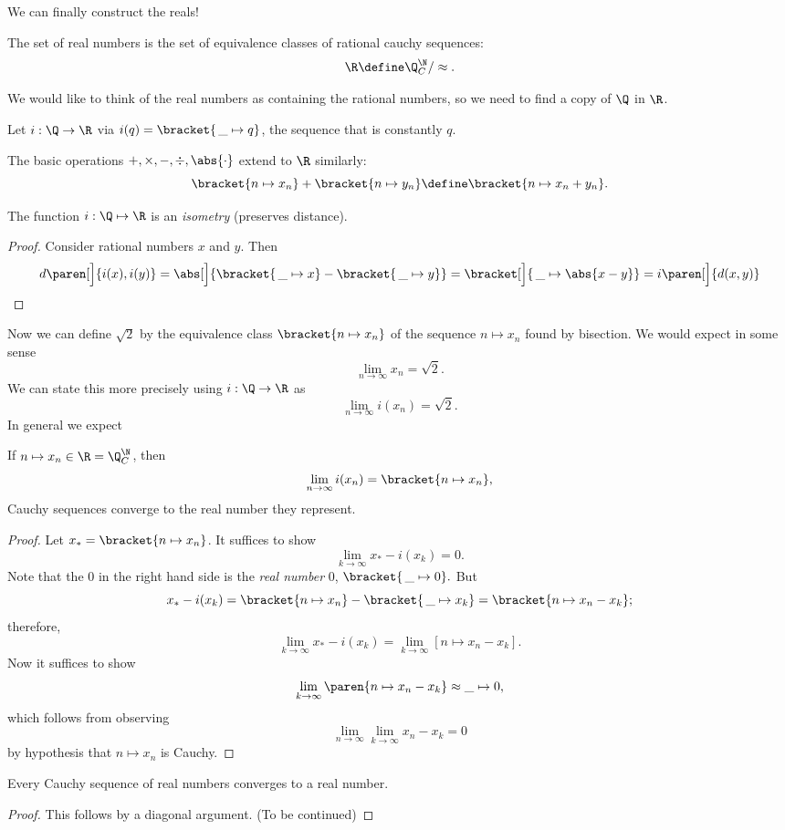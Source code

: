 \documentclass{scrartcl}
\newcommand{\dist}{d}
\begin{document}
We can finally construct the reals!
\begin{defn}
  The set of real numbers is the set of equivalence classes of rational cauchy sequences:
  \[\R \define \Q^\N_{C}/\approx.\]
\end{defn}

We would like to think of the real numbers as containing the rational numbers, so we need to find a copy of $\Q$ in $\R$.
\begin{defn}
  Let $i: \Q \to \R$ via $i(q) = \bracket{\,\_{} \mapsto q}$, the sequence that is constantly $q$.
\end{defn}

The basic operations $+,\times,-,\div,\abs{\cdot}$ extend to $\R$ similarly:
\[
  \bracket{n\mapsto x_{n}} + \bracket{n\mapsto y_{n}} \define \bracket{n\mapsto x_{n}+y_{n}}.
\]
\begin{theorem}
  The function $i: \Q \mapsto \R$ is an \emph{isometry} (preserves distance).
\end{theorem}
\begin{proof}
  Consider rational numbers $x$ and $y$. Then
  \[
    \dist\paren[\Big]{i(x),i(y)} = \abs[\Big]{\bracket{\,\_{}\mapsto x}- \bracket{\,\_{}\mapsto y}} = \bracket[\Big]{\,\_{}\mapsto \abs{x-y}} = i\paren[\Big]{\dist(x,y)}
  \]
\end{proof}

Now we can define $\sqrt 2$ by the equivalence class $\bracket{n\mapsto x_{n}}$ of the sequence $n\mapsto x_{n}$ found by bisection. We would expect in some sense
\[
  \lim_{{n\to\infty}}x_{n} = \sqrt 2.
\]
We can state this more precisely using $i:\Q\to\R$ as
\[
  \lim_{n\to\infty}i(x_{n}) = \sqrt 2.
\]
In general we expect
\begin{theorem}
  If $n\mapsto x_{n} \in \R=\Q^{\N}_{C}$, then
  \[
    \lim_{n\to\infty} i(x_{n}) = \bracket{n\mapsto x_{n}},
  \]
  \ie{} Cauchy sequences converge to the real number they represent.
\end{theorem}
\begin{proof}
  Let $x_{*}=\bracket{n\mapsto x_{n}}$. It suffices to show
  \[
    \lim_{k\to\infty} x_{*}-i(x_{k}) = 0.
  \]
  Note that the $0$ in the right hand side is the \emph{real number} 0, \ie{}
  \(
    \bracket{\,\_{}\mapsto 0}.
  \)
  But
  \[
    x_{*} - i(x_{k}) = \bracket{n \mapsto x_{n}}-\bracket{\,\_{}\mapsto x_{k}} = \bracket{n\mapsto x_{n}-x_{k}};
  \]
  therefore,
  \[
    \lim_{{k\to\infty}} x_{*}-i(x_{k}) = \lim_{k\to\infty} [n\mapsto x_{n}-x_{k}].
  \]
  Now it suffices to show
  \[
    \lim_{k\to\infty}\paren{n\mapsto x_{n} -x_{k}} \approx \_{}\mapsto0,
  \]
  which follows from observing
  \[
    \lim_{n\to\infty}\lim_{k\to\infty} x_{n}-x_{k} =0
  \]
  by hypothesis that $n\mapsto x_{n}$ is Cauchy.
\end{proof}
\begin{theorem}
  Every Cauchy sequence of real numbers converges to a real number.
\end{theorem}
\begin{proof}
  This follows by a diagonal argument. (To be continued)
\end{proof}
\end{document}
